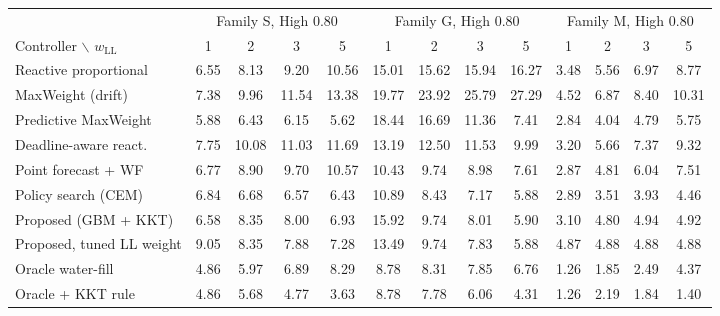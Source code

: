 \begin{tabular}{l|cccc|cccc|cccc}
\hline
& \multicolumn{4}{c}{Family S, High 0.80} & \multicolumn{4}{c}{Family G, High 0.80} & \multicolumn{4}{c}{Family M, High 0.80} \\
Controller $\backslash$ $w_{\mathrm{LL}}$ & 1 & 2 & 3 & 5 & 1 & 2 & 3 & 5 & 1 & 2 & 3 & 5 \\
\hline
Reactive proportional & 6.55 & 8.13 & 9.20 & 10.56 & 15.01 & 15.62 & 15.94 & 16.27 & 3.48 & 5.56 & 6.97 & 8.77 \\
MaxWeight (drift) & 7.38 & 9.96 & 11.54 & 13.38 & 19.77 & 23.92 & 25.79 & 27.29 & 4.52 & 6.87 & 8.40 & 10.31 \\
Predictive MaxWeight & 5.88 & 6.43 & 6.15 & 5.62 & 18.44 & 16.69 & 11.36 & 7.41 & 2.84 & 4.04 & 4.79 & 5.75 \\
Deadline-aware react. & 7.75 & 10.08 & 11.03 & 11.69 & 13.19 & 12.50 & 11.53 & 9.99 & 3.20 & 5.66 & 7.37 & 9.32 \\
Point forecast + WF & 6.77 & 8.90 & 9.70 & 10.57 & 10.43 & 9.74 & 8.98 & 7.61 & 2.87 & 4.81 & 6.04 & 7.51 \\
Policy search (CEM) & 6.84 & 6.68 & 6.57 & 6.43 & 10.89 & 8.43 & 7.17 & 5.88 & 2.89 & 3.51 & 3.93 & 4.46 \\
Proposed (GBM + KKT) & 6.58 & 8.35 & 8.00 & 6.93 & 15.92 & 9.74 & 8.01 & 5.90 & 3.10 & 4.80 & 4.94 & 4.92 \\
Proposed, tuned LL weight & 9.05 & 8.35 & 7.88 & 7.28 & 13.49 & 9.74 & 7.83 & 5.88 & 4.87 & 4.88 & 4.88 & 4.88 \\
\hline
Oracle water-fill & 4.86 & 5.97 & 6.89 & 8.29 & 8.78 & 8.31 & 7.85 & 6.76 & 1.26 & 1.85 & 2.49 & 4.37 \\
Oracle + KKT rule & 4.86 & 5.68 & 4.77 & 3.63 & 8.78 & 7.78 & 6.06 & 4.31 & 1.26 & 2.19 & 1.84 & 1.40 \\
\hline
\end{tabular}
